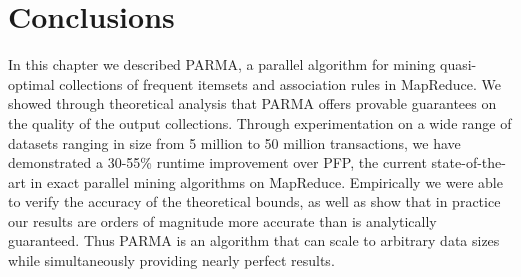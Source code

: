 \section{Conclusions}
\label{sec:parmaconc}

In this chapter we described PARMA, a parallel algorithm for mining
quasi-optimal collections of frequent itemsets and association rules in MapReduce.
We showed through theoretical analysis that PARMA offers provable guarantees on
the quality of the output collections. Through experimentation on a wide range
of datasets ranging in size from 5 million to 50 million transactions,
we have demonstrated a 30-55\% runtime improvement over PFP, the
current state-of-the-art in exact parallel mining algorithms on MapReduce.
Empirically we were able to verify the accuracy of the theoretical bounds, as
well as show that in practice our results are orders of magnitude more accurate
than is analytically guaranteed. Thus PARMA is an algorithm that can scale to
arbitrary data sizes while simultaneously providing nearly perfect results. 

